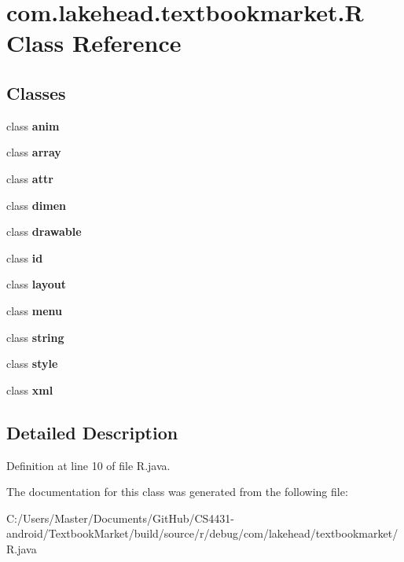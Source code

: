 \hypertarget{classcom_1_1lakehead_1_1textbookmarket_1_1_r}{\section{com.\-lakehead.\-textbookmarket.\-R Class Reference}
\label{classcom_1_1lakehead_1_1textbookmarket_1_1_r}
}
\subsection*{Classes}
\begin{DoxyCompactItemize}
\item 
class {\bfseries anim}
\item 
class {\bfseries array}
\item 
class {\bfseries attr}
\item 
class {\bfseries dimen}
\item 
class {\bfseries drawable}
\item 
class {\bfseries id}
\item 
class {\bfseries layout}
\item 
class {\bfseries menu}
\item 
class {\bfseries string}
\item 
class {\bfseries style}
\item 
class {\bfseries xml}
\end{DoxyCompactItemize}


\subsection{Detailed Description}


Definition at line 10 of file R.\-java.



The documentation for this class was generated from the following file\-:\begin{DoxyCompactItemize}
\item 
C\-:/\-Users/\-Master/\-Documents/\-Git\-Hub/\-C\-S4431-\/android/\-Textbook\-Market/build/source/r/debug/com/lakehead/textbookmarket/R.\-java\end{DoxyCompactItemize}
